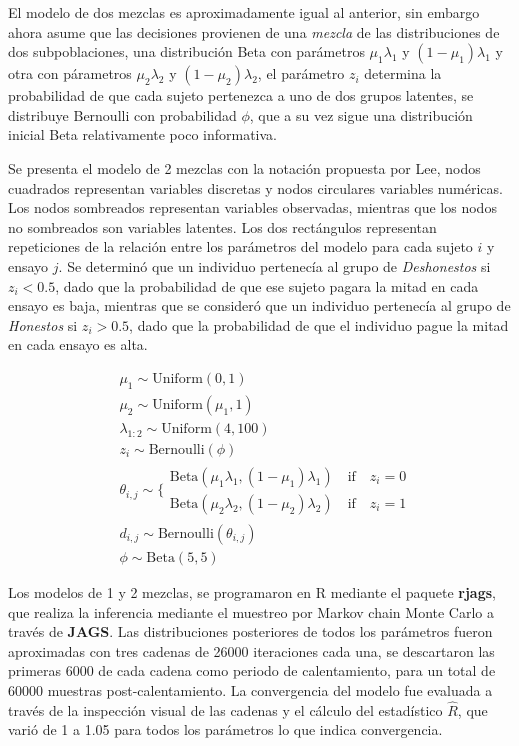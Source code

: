 \documentclass[12pt,]{article}
\begin{document}
El modelo de dos mezclas es aproximadamente igual al anterior, sin
embargo ahora asume que las decisiones provienen de una \emph{mezcla} de
las distribuciones de dos subpoblaciones, una distribución Beta con
parámetros \(\mu_1\lambda_1\) y \((1 - \mu_1) \lambda_1\) y otra con
párametros \(\mu_2\lambda_2\) y \((1 - \mu_2) \lambda_2\), el parámetro
\(z_i\) determina la probabilidad de que cada sujeto pertenezca a uno de
dos grupos latentes, se distribuye Bernoulli con probabilidad \(\phi\),
que a su vez sigue una distribución inicial Beta relativamente poco
informativa.

Se presenta el modelo de 2 mezclas con la notación propuesta por Lee,
nodos cuadrados representan variables discretas y nodos circulares
variables numéricas. Los nodos sombreados representan variables
observadas, mientras que los nodos no sombreados son variables latentes.
Los dos rectángulos representan repeticiones de la relación entre los
parámetros del modelo para cada sujeto \(i\) y ensayo \(j\). Se
determinó que un individuo pertenecía al grupo de \emph{Deshonestos} si
\(z_i < 0.5\), dado que la probabilidad de que ese sujeto pagara la
mitad en cada ensayo es baja, mientras que se consideró que un individuo
pertenecía al grupo de \emph{Honestos} si \(z_i > 0.5\), dado que la
probabilidad de que el individuo pague la mitad en cada ensayo es alta.

\[
\begin{aligned} 
&\mu_1 \sim \mathrm{Uniform}(0, 1)\\
&\mu_2 \sim \mathrm{Uniform}(\mu_1, 1)\\
&\lambda_{1:2} \sim \mathrm{Uniform}(4, 100)\\
&z_i \sim \mathrm{Bernoulli}(\phi)\\
&\theta_{i,j} \sim \Bigg\{
  \begin{array} {lr} 
    \mathrm{Beta}(\mu_1\lambda_1, (1 - \mu_1)\lambda_1) \quad \mbox{if} \quad z_i = 0 \\
    \mathrm{Beta}(\mu_2\lambda_2, (1 - \mu_2)\lambda_2) \quad \mbox{if} \quad z_i = 1
  \end{array} \\
&d_{i,j} \sim \mathrm{Bernoulli}(\theta_{i,j})\\
&\phi \sim \mathrm{Beta}(5, 5)
\end{aligned}
\]

Los modelos de 1 y 2 mezclas, se programaron en R mediante el paquete
\textbf{rjags}, que realiza la inferencia mediante el muestreo por
Markov chain Monte Carlo a través de \textbf{JAGS}. Las distribuciones
posteriores de todos los parámetros fueron aproximadas con tres cadenas
de 26000 iteraciones cada una, se descartaron las primeras 6000 de cada
cadena como periodo de calentamiento, para un total de 60000 muestras
post-calentamiento. La convergencia del modelo fue evaluada a través de
la inspección visual de las cadenas y el cálculo del estadístico
\(\hat{R}\), que varió de 1 a 1.05 para todos los parámetros lo que
indica convergencia.
\end{document}
